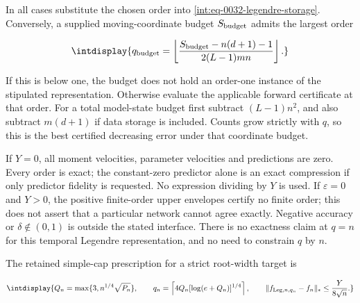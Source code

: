 
In all cases substitute the chosen order into \eqref{int:eq-0032-legendre-storage}. Conversely, a supplied moving-coordinate budget \(S_{\rm budget}\) admits the largest order


\begingroup\renewcommand{\theHequation}{intdisplay.143}
\begin{equation}
\intdisplay{
q_{\rm budget}=\left\lfloor
\frac{S_{\rm budget}-n(d+1)-1}{2(L-1)mn}\right\rfloor.
}
\label{int:eq-0052-legendre-storage-inverse}
\end{equation}
\endgroup


If this is below one, the budget does not hold an order-one instance of the stipulated representation. Otherwise evaluate the applicable forward certificate at that order. For a total model-state budget first subtract \((L-1)n^2\), and also subtract \(m(d+1)\) if data storage is included. Counts grow strictly with \(q\), so this is the best certified decreasing error under that coordinate budget.



If \(Y=0\), all moment velocities, parameter velocities and predictions are zero. Every order is exact; the constant-zero predictor alone is an exact compression if only predictor fidelity is requested. No expression dividing by \(Y\) is used. If \(\varepsilon=0\) and \(Y>0\), the positive finite-order upper envelopes certify no finite order; this does not assert that a particular network cannot agree exactly. Negative accuracy or \(\delta\notin(0,\allowbreak 1)\) is outside the stated interface. There is no exactness claim at \(q=n\) for this temporal Legendre representation, and no need to constrain \(q\) by \(n\).



The retained simple-cap prescription for a strict root-width target is


\begingroup\renewcommand{\theHequation}{intdisplay.144}
\begin{equation}
\intdisplay{
Q_n=\max\{3,n^{1/4}\sqrt{P_n}\},\qquad
q_n=\left\lceil4Q_n[\log(e+Q_n)]^{1/4}\right\rceil,
\qquad
\|f_{{\rm Leg},n,q_n}-f_n\|_*\le\frac{Y}{8\sqrt n}.
}
\label{int:eq-0053-legendre-root-width-order}
\end{equation}
\endgroup


